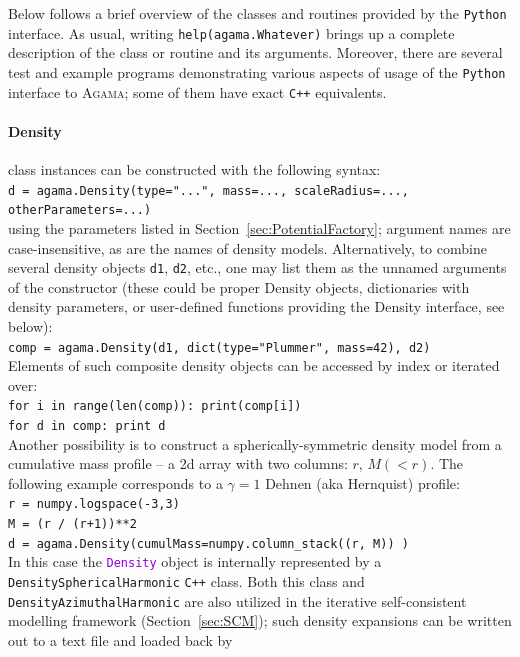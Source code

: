 \documentclass[12pt]{article}
\newcommand{\Agama}{\textsc{Agama}\xspace}
\newcommand{\Cpp}  {\texttt{C++}\xspace}
\newcommand{\Python}{\texttt{Python}\xspace}
\newcommand{\ttt}[1]{\textcolor{darkviolet}{\texttt{#1}}}
\newcommand{\ppp}[1]{\textcolor{darkolive} {\texttt{#1}}}
\begin{document}
Below follows a brief overview of the classes and routines provided by the \Python interface.
As usual, writing \texttt{help(agama.Whatever)} brings up a complete description of the class or routine and its arguments. Moreover, there are several test and example programs demonstrating various aspects of usage of the \Python interface to \Agama; some of them have exact \Cpp equivalents.

\paragraph{Density} class instances can be constructed with the following syntax: \\
\texttt{d = agama.Density(type="...", mass=..., scaleRadius=..., otherParameters=...)}\\
using the parameters listed in Section~\ref{sec:PotentialFactory}; argument names are case-insensitive, as are the names of density models. 
Alternatively, to combine several density objects \texttt{d1}, \texttt{d2}, etc., one may list them as the unnamed arguments of the constructor (these could be proper Density objects, dictionaries with density parameters, or user-defined functions providing the Density interface, see below):\\
\texttt{comp = agama.Density(d1, dict(type="Plummer", mass=42), d2)}\\[2mm]
Elements of such composite density objects can be accessed by index or iterated over:\\
\texttt{for i in range(len(comp)): print(comp[i])}\\
\texttt{for d in comp: print d}\\[2mm]
Another possibility is to construct a spherically-symmetric density model from a cumulative mass profile -- a 2d array with two columns: $r$, $M(<r)$. The following example corresponds to a $\gamma=1$ Dehnen (aka Hernquist) profile:\\
\texttt{r = numpy.logspace(-3,3)}\\
\texttt{M = (r / (r+1))**2}\\
\texttt{d = agama.Density(cumulMass=numpy.column_stack((r, M)) )}\\[2mm]
In this case the \ttt{Density} object is internally represented by a \ppp{DensitySphericalHarmonic} \Cpp class. Both this class and \ppp{DensityAzimuthalHarmonic} are also utilized in the iterative self-consistent modelling framework (Section~\ref{sec:SCM}); such density expansions can be written out to a text file and loaded back by\\
\end{document}
